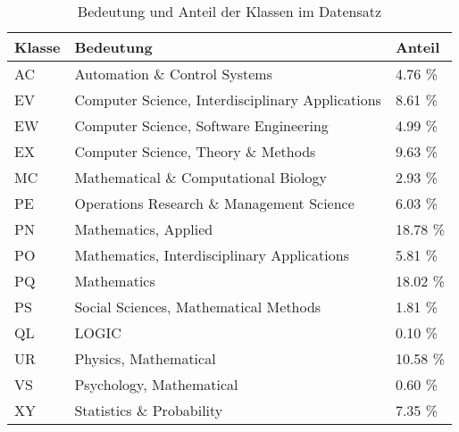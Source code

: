 \begin{table}[h]
    \centering
    \begin{tabular}{l|l|l}
        \tiny\textbf{Klasse} & \tiny\textbf{Bedeutung} & \tiny\textbf{Anteil}\\
        \hline
        \tiny AC & \tiny Automation \& Control Systems                      &\tiny  4.76 \%  \\
        \tiny EV & \tiny Computer Science, Interdisciplinary Applications   &\tiny  8.61 \%  \\
        \tiny EW & \tiny Computer Science, Software Engineering             &\tiny  4.99 \%  \\
        \tiny EX & \tiny Computer Science, Theory \& Methods                &\tiny  9.63 \%  \\
        \tiny MC & \tiny Mathematical \& Computational Biology              &\tiny  2.93 \%  \\
        \tiny PE & \tiny Operations Research \& Management Science          &\tiny  6.03 \%  \\
        \tiny PN & \tiny Mathematics, Applied                               &\tiny  18.78 \% \\
        \tiny PO & \tiny Mathematics, Interdisciplinary Applications        &\tiny  5.81 \%  \\
        \tiny PQ & \tiny Mathematics                                        &\tiny  18.02 \% \\
        \tiny PS & \tiny Social Sciences, Mathematical Methods              &\tiny  1.81 \%  \\
        \tiny QL & \tiny LOGIC                                              &\tiny  0.10 \%  \\
        \tiny UR & \tiny Physics, Mathematical                              &\tiny  10.58 \% \\
        \tiny VS & \tiny Psychology, Mathematical                           &\tiny  0.60 \%  \\
        \tiny XY & \tiny Statistics \& Probability                          &\tiny  7.35 \%  \\
    \end{tabular}
    \caption{Bedeutung und Anteil der Klassen im Datensatz}
    \label{tab:class_meaning}
\end{table}

